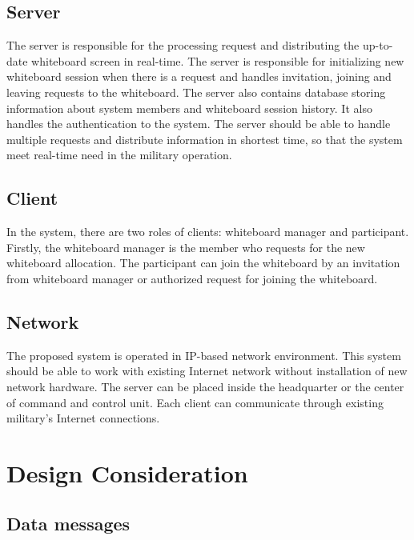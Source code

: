 \documentclass[conference]{IEEEtran}
\begin{document}
\subsection{Server}

The server is responsible for the processing request and distributing the up-to-date whiteboard screen in real-time. 
The server is responsible for initializing new whiteboard session when there is a request and handles invitation, joining and leaving requests to the whiteboard. 
The server also contains database storing information about system members and whiteboard session history. 
It also handles the authentication to the system. 
The server should be able to handle multiple requests and distribute information in shortest time, so that the system meet real-time need in the military operation.

\subsection{Client}

In the system, there are two roles of clients: whiteboard manager and participant.  
Firstly, the whiteboard manager is the member who requests for the new whiteboard allocation. 
The participant can join the whiteboard by an invitation from whiteboard manager or authorized request for joining the whiteboard. 

\subsection{Network}

The proposed system is operated in IP-based network environment. 
This system should be able to work with existing Internet network without installation of new network hardware.  
The server can be placed inside the headquarter or the center of command and control unit. 
Each client can communicate through existing military's Internet connections. 

\section{Design Consideration}

\subsection{Data messages}
\end{document}
